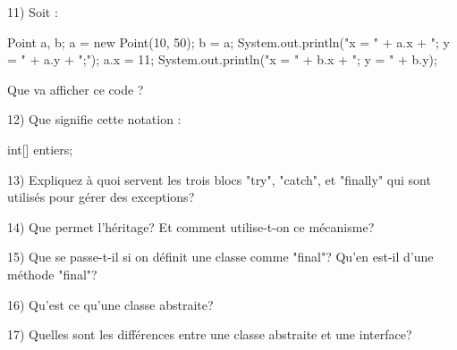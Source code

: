 \documentclass[a4paper,11pt]{article}
\begin{document}
11) Soit :
\begin{java}
Point a, b;
a = new Point(10, 50);
b = a;
System.out.println("x = " + a.x + "; y = " + a.y + ";");
a.x = 11;
System.out.println("x = " + b.x + "; y = " + b.y);
\end{java}
Que va afficher ce code ?



12) Que signifie cette notation :
\begin{java}
int[] entiers;
\end{java}

13) Expliquez à quoi servent les trois blocs "try", "catch", et "finally" qui sont utilisés pour gérer des exceptions?




14) Que permet l'héritage? Et comment utilise-t-on ce mécanisme?


15) Que se passe-t-il si on définit une classe comme "final"? Qu'en est-il d'une méthode "final"?


16) Qu'est ce qu'une classe abstraite?


17) Quelles sont les différences entre une classe abstraite et une interface?

\end{document}
